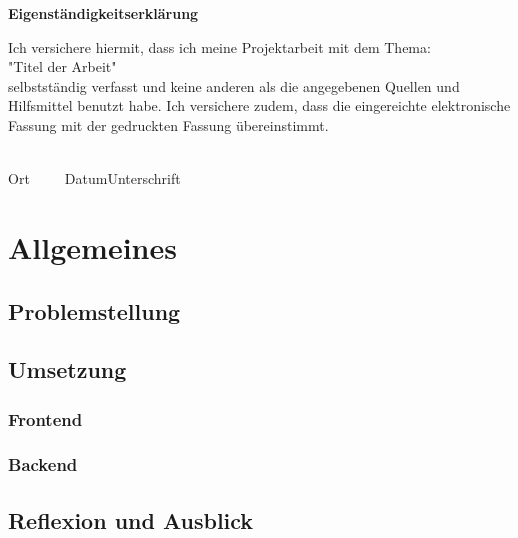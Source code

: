 \documentclass[12pt]{scrreprt}
\begin{document}
\begin{framed}
    \begin{center}
        \Large\bfseries Eigenständigkeitserklärung
    \end{center}
    \medskip
    \noindent
    Ich versichere hiermit, dass ich meine Projektarbeit mit dem Thema:\\
    "Titel der Arbeit"\\
    selbstständig verfasst und keine anderen als die angegebenen Quellen und Hilfsmittel benutzt habe. Ich versichere zudem,
    dass die eingereichte elektronische Fassung mit der gedruckten Fassung übereinstimmt.


    \vspace{3cm}
    \noindent
    \underline{\hspace{4cm}}\hfill\underline{\hspace{6cm}}\\
    Ort~~~~~Datum\hfill Unterschrift\hspace{4cm}
\end{framed}
\pagebreak



\listoffigures
\clearpage
\pagebreak

\tableofcontents
\clearpage
\pagebreak

\chapter{Allgemeines}
\section{Problemstellung}
\section{Umsetzung}
\subsection{Frontend}
\subsection{Backend}
\section{Reflexion und Ausblick}
\end{document}
